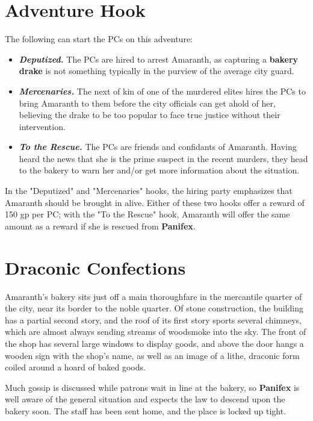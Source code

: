 \documentclass[10pt,a4paper,twoside,bg=print,twocolumn,openany,nodeprecatedcode]{dndbook}
\begin{document}
\section{Adventure Hook}
The following can start the PCs on this adventure:


\begin{itemize}
\item \textbf{\textit{Deputized.}} The PCs are hired to arrest Amaranth, as capturing a \textbf{bakery drake} is not something typically in the purview of the average city guard.
\item \textbf{\textit{Mercenaries.}} The next of kin of one of the murdered elites hires the PCs to bring Amaranth to them before the city officials can get ahold of her, believing the drake to be too popular to face true justice without their intervention.
\item \textbf{\textit{To the Rescue.}} The PCs are friends and confidants of Amaranth. Having heard the news that she is the prime suspect in the recent murders, they head to the bakery to warn her and/or get more information about the situation.
\end{itemize}

In the "Deputized" and "Mercenaries" hooks, the hiring party emphasizes that Amaranth should be brought in alive. Either of these two hooks offer a reward of 150 gp per PC; with the "To the Rescue" hook, Amaranth will offer the same amount as a reward if she is rescued from \textbf{Panifex}.

\section{Draconic Confections}
Amaranth's bakery sits just off a main thoroughfare in the mercantile quarter of the city, near its border to the noble quarter. Of stone construction, the building has a partial second story, and the roof of its first story sports several chimneys, which are almost always sending streams of woodsmoke into the sky. The front of the shop has several large windows to display goods, and above the door hangs a wooden sign with the shop's name, as well as an image of a lithe, draconic form coiled around a hoard of baked goods.

Much gossip is discussed while patrons wait in line at the bakery, so \textbf{Panifex} is well aware of the general situation and expects the law to descend upon the bakery soon. The staff has been sent home, and the place is locked up tight.
\end{document}
